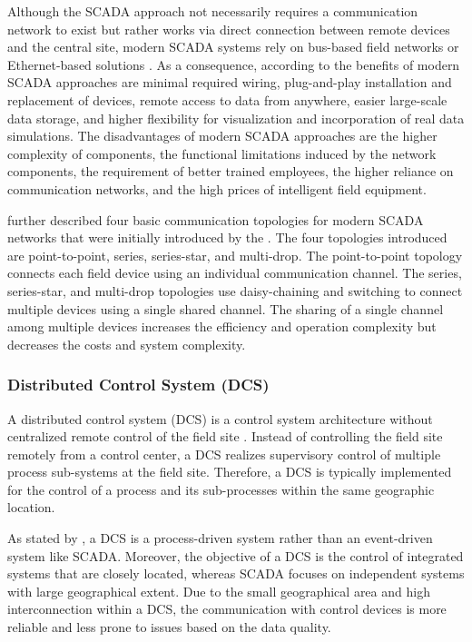 Although the SCADA approach not necessarily requires a communication network to exist but rather works via direct connection between remote devices and the central site, modern SCADA systems rely on bus-based field networks or Ethernet-based solutions \cite{bailey2003}.
As a consequence, according to \citeauthor{bailey2003} the benefits of modern SCADA approaches are minimal required wiring, plug-and-play installation and replacement of devices, remote access to data from anywhere, easier large-scale data storage, and higher flexibility for visualization and incorporation of real data simulations.
The disadvantages of modern SCADA approaches are the higher complexity of components, the functional limitations induced by the network components, the requirement of better trained employees, the higher reliance on communication networks, and the high prices of intelligent field equipment.

\citeauthor{Stouffer2023} \cite{Stouffer2023} further described four basic communication topologies for modern SCADA networks that were initially introduced by the \citeauthor{aga2006} \cite{aga2006}.
The four topologies introduced are point-to-point, series, series-star, and multi-drop.
The point-to-point topology connects each field device using an individual communication channel.
The series, series-star, and multi-drop topologies use daisy-chaining and switching to connect multiple devices using a single shared channel.
The sharing of a single channel among multiple devices increases the efficiency and operation complexity but decreases the costs and system complexity.

\subsubsection{Distributed Control System (DCS)}
A distributed control system (DCS) is a control system architecture without centralized remote control of the field site \cite{Stouffer2023}.
Instead of controlling the field site remotely from a control center, a DCS realizes supervisory control of multiple process sub-systems at the field site.
Therefore, a DCS is typically implemented for the control of a process and its sub-processes within the same geographic location.

As stated by \citeauthor{Galloway2013} \cite{Galloway2013}, a DCS is a process-driven system rather than an event-driven system like SCADA.
Moreover, the objective of a DCS is the control of integrated systems that are closely located, whereas SCADA focuses on independent systems with large geographical extent. 
Due to the small geographical area and high interconnection within a DCS, the communication with control devices is more reliable and less prone to issues based on the data quality.

